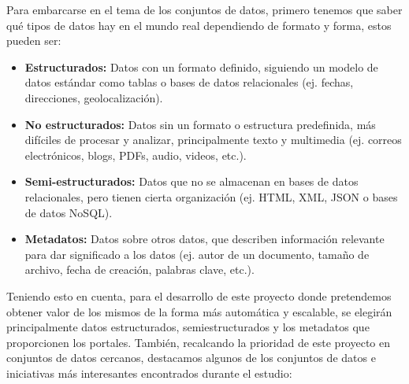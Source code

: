 Para embarcarse en el tema de los conjuntos de datos, primero tenemos que saber qué tipos de datos hay en el mundo real \citep{Sarker2021} dependiendo de formato y forma, estos pueden ser:

\begin{itemize} \label{tipos_de_datos}
	\item \textbf{Estructurados:} Datos con un formato definido, siguiendo un modelo de datos estándar como tablas o bases de datos relacionales (ej. fechas, direcciones, geolocalización).
	
	\item \textbf{No estructurados:} Datos sin un formato o estructura predefinida, más difíciles de procesar y analizar, principalmente texto y multimedia (ej. correos electrónicos, blogs, PDFs, audio, videos, etc.).
	
	\item \textbf{Semi-estructurados:} Datos que no se almacenan en bases de datos relacionales, pero tienen cierta organización (ej. HTML, XML, JSON o bases de datos NoSQL).
	
	\item \textbf{Metadatos:} Datos sobre otros datos, que describen información relevante para dar significado a los datos (ej. autor de un documento, tamaño de archivo, fecha de creación, palabras clave, etc.).
\end{itemize}

Teniendo esto en cuenta, para el desarrollo de este proyecto donde pretendemos obtener valor de los mismos de la forma más automática y escalable, se elegirán principalmente datos estructurados, semiestructurados y los metadatos que proporcionen los portales. También, recalcando la prioridad de este proyecto en conjuntos de datos cercanos, destacamos algunos de los conjuntos de datos e iniciativas más interesantes encontrados durante el estudio:

